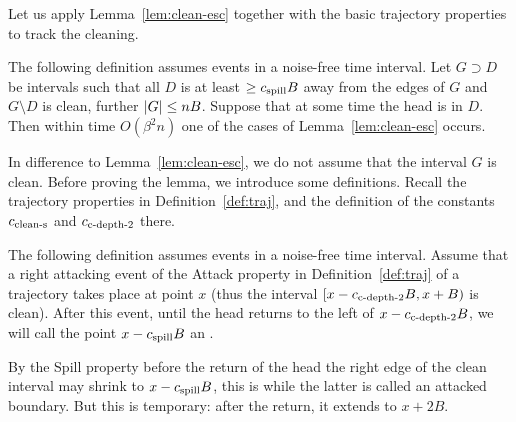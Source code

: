 \documentclass[12pt]{memoir}
\renewcommand{\le}{\leq}
\renewcommand{\ge}{\geq}
\def\B{B}
\def\G{G}
\newcommand{\cns}[1]{c_{\textrm{\upshape #1}}}
\newcommand{\cCleanS}{\cns{clean-s}}
\newcommand{\cCDepth}[1]{\cns{c-depth-#1}}
\newcommand{\cSpill}{\cns{spill}}
\begin{document}
Let us apply Lemma~\ref{lem:clean-esc} together with
the basic trajectory properties to track the cleaning.

\begin{lemma}[Escape]\label{lem:escape}
The following definition assumes events in a noise-free time interval.
Let \( \G\supset D \) be intervals such that all \( D \) is 
at least \( \ge\cSpill \B \) away from the edges of \( G \) and
\( G\setminus D \) is clean,
further \( \abs{G}\le n\B \).
Suppose that at some time the head is in \( D \).
Then within time \( O(\beta^{2}n) \) one of the cases of Lemma~\ref{lem:clean-esc} occurs.
  \end{lemma}

In difference to Lemma~\ref{lem:clean-esc}, we do not assume 
that the interval \( G \) is clean.
Before proving the lemma, we introduce some definitions.
Recall the trajectory properties in Definition~\ref{def:traj}, and the 
definition of the constants \( \cCleanS  \) and \( \cCDepth2  \)
there.
\begin{sloppypar}
\begin{definition}\label{def:right-live}
The following definition assumes events in a noise-free time interval.
Assume that a right attacking event of the Attack property in Definition~\ref{def:traj}
of a trajectory takes place at point \( x \) (thus the interval
\( \lint{x-\cCDepth2\B}{x+\B} \) is clean).
After this event, until the head returns to the left of \( x-\cCDepth2 \B \),
we will call the point \( x-\cSpill \B \) an .
\end{definition}
\end{sloppypar}

By the Spill property
before the return of the head the right edge of the clean interval may shrink to
\( {x-\cSpill \B} \), this is while the latter is called an attacked boundary.
But this is temporary: after the return, it extends to \( {x+2\B} \).
\end{document}
